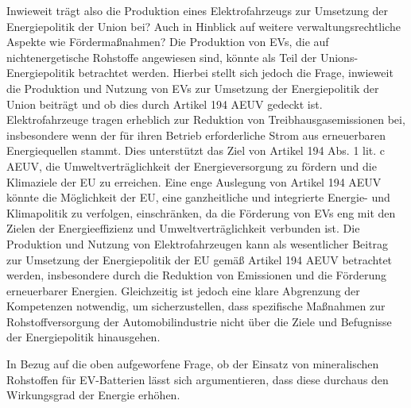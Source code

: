 \documentclass[12pt,a4paper,oneside]{book} %
\begin{document}
	Inwieweit trägt also die Produktion eines Elektrofahrzeugs zur Umsetzung der Energiepolitik der Union bei? Auch in Hinblick auf weitere verwaltungsrechtliche Aspekte wie Fördermaßnahmen?
	Die Produktion von EVs, die auf nichtenergetische Rohstoffe angewiesen sind, könnte als Teil der Unions-Energiepolitik betrachtet werden. Hierbei stellt sich jedoch die Frage, inwieweit die Produktion und Nutzung von EVs zur Umsetzung der Energiepolitik der Union beiträgt und ob dies durch Artikel 194 AEUV gedeckt ist. Elektrofahrzeuge tragen erheblich zur Reduktion von Treibhausgasemissionen bei, insbesondere wenn der für ihren Betrieb erforderliche Strom aus erneuerbaren Energiequellen stammt. Dies unterstützt das Ziel von Artikel 194 Abs. 1 lit. c AEUV, die Umweltverträglichkeit der Energieversorgung zu fördern und die Klimaziele der EU zu erreichen. Eine enge Auslegung von Artikel 194 AEUV könnte die Möglichkeit der EU, eine ganzheitliche und integrierte Energie- und Klimapolitik zu verfolgen, einschränken, da die Förderung von EVs eng mit den Zielen der Energieeffizienz und Umweltverträglichkeit verbunden ist.
	Die Produktion und Nutzung von Elektrofahrzeugen kann als wesentlicher Beitrag zur Umsetzung der Energiepolitik der EU gemäß Artikel 194 AEUV betrachtet werden, insbesondere durch die Reduktion von Emissionen und die Förderung erneuerbarer Energien. Gleichzeitig ist jedoch eine klare Abgrenzung der Kompetenzen notwendig, um sicherzustellen, dass spezifische Maßnahmen zur Rohstoffversorgung der Automobilindustrie nicht über die Ziele und Befugnisse der Energiepolitik hinausgehen.
	
	
	In Bezug auf die oben aufgeworfene Frage, ob der Einsatz von mineralischen Rohstoffen für EV-Batterien lässt sich argumentieren, dass diese durchaus den Wirkungsgrad der Energie erhöhen. 
	
\end{document}
